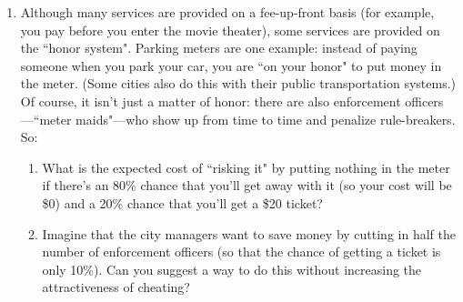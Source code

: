 \begin{enumerate}
\item Although many services are provided on a fee-up-front basis (for example, you pay before you enter the movie theater), some services are provided on the ``honor system". Parking meters are one example: instead of paying someone when you park your car, you are ``on your honor" to put money in the meter. (Some cities also do this with their public transportation systems.) Of course, it isn't just a matter of honor: there are also enforcement officers---``meter maids"---who show up from time to time and penalize rule-breakers. So:

    \begin{enumerate}

    \item What is the expected cost of ``risking it" by putting nothing in the meter if there's an 80\% chance that you'll get away with it (so your cost will be \$0) and a 20\% chance that you'll get a \$20 ticket?


\begin{comment}
    \item If the ``safe option" is to put \$3 in the meter, can you say for sure whether a risk-neutral individual will risk it or to play it safe? (Circle one: Risk it\ \ \ \ Play it safe\ \ \ \ Can't say for sure) Can you say for sure what a risk-averse individual will do? (Circle one: Risk it\ \ \ \ Play it safe\ \ \ \ Can't say for sure) What about a risk-loving individual? (Circle one: Risk it\ \ \ \ Play it safe\ \ \ \ Can't say for sure) (\emph{Hint:} Recall that risk-averse individuals avoid fair bets, that risk-loving individuals accept fair bets, and that risk-neutral individuals are indifferent towards fair bets.)\endnote{Since the safe option has a lower expected cost (\$3 instead of \$4), a risk-neutral individual will choose to play it safe. Since risk-averse individuals don't take fair bets, they will also play it safe. But we can't say for sure about risk-loving individuals because it depends on how much they like risk.}
\end{comment}


    \item Imagine that the city managers want to save money by cutting in half the number of enforcement officers (so that the chance of getting a ticket is only 10\%). Can you suggest a way to do this without increasing the attractiveness of cheating?
    \end{enumerate}


\end{enumerate}


















